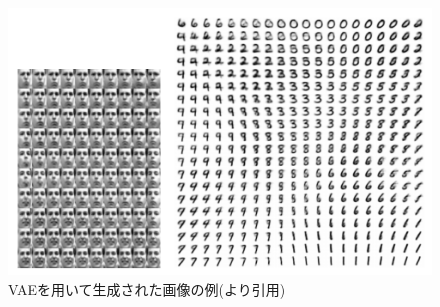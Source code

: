 \begin{figure}[tbp]
  \begin{center}
    \includegraphics[width=\linewidth]{./figures/vae.png}
    \caption{VAEを用いて生成された画像の例(\cite{vae}より引用)}
    \label{fig:vae}
  \end{center}
\end{figure}

